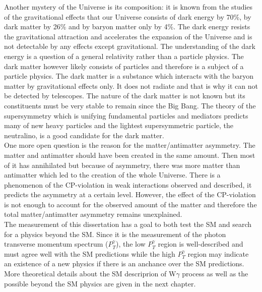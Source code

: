 Another mystery of the Universe is its composition: it is known from the studies of the gravitational effects that our Universe consists of dark energy by 70\%, by dark matter by 26\% and by baryon matter only by 4\%. The dark energy resists the gravitational attraction and accelerates the expansion of the Universe and is not detectable by any effects except gravitational. The understanding of the dark energy is a question of a general relativity rather than a particle physics. The dark matter however likely consists of particles and therefore is a subject of a particle physics. The dark matter is a substance which interacts with the baryon matter by gravitational effects only. It does not radiate and that is why it can not be detected by telescopes. The nature of the dark matter is not known but its constituents must be very stable to remain since the Big Bang. The theory of the supersymmetry which is unifying fundamental particles and mediators predicts many of new heavy particles and the lightest supersymmetric particle, the neutralino, is a good candidate for the dark matter.\\

One more open question is the reason for the matter/antimatter asymmetry. The matter and antimatter should have been created in the same amount. Then most of it has annihilated but because of asymmetry, there was more matter than antimatter which led to the creation of the whole Universe. There is a phenomenon of the CP-violation in weak interactions observed and described, it predicts the asymmetry at a certain level. However, the effect of the CP-violation is not enough to account for the observed amount of the matter and therefore the total matter/antimatter asymmetry remains unexplained. \\

The measurement of this dissertation has a goal to both test the SM and search for a physics beyond the SM. Since it is the measurement of the photon transverse momentum spectrum ($P_T^{\gamma}$), the low $P_T^{\gamma}$ region is well-described and must agree well with the SM predictions while the high $P_T^{\gamma}$ region may indicate an existence of a new physics if there is an anchance over the SM predictions. More theoretical details about the SM descriprion of W$\gamma$ process as well as the possible beyond the SM physics are given in the next chapter. \\   


